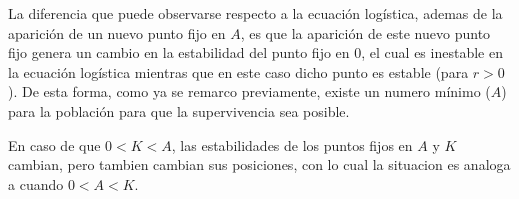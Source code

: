 La diferencia que puede observarse respecto a la ecuación logística, ademas de la aparición de un nuevo punto fijo en $A$, es que la aparición de este nuevo punto fijo genera un cambio en la estabilidad del punto fijo en $0$, el cual es inestable en la ecuación logística mientras que en este caso dicho punto es estable (para $r>0$). De esta forma, como ya se remarco previamente, existe un numero mínimo ($A$) para la población para que la supervivencia sea posible.

En caso de que $0<K<A$, las estabilidades de los puntos fijos en $A$ y $K$ cambian, pero tambien cambian sus posiciones, con lo cual la situacion es analoga a cuando $0<A<K$.
